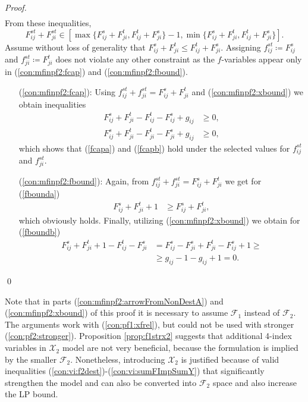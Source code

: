 \begin{proof}
\begin{subequations}
\begin{align}
\end{align}
\end{subequations}
From these inequalities,
$$
 F^{st}_{ij} +  F^{st}_{ji}\in\left[\max\{F^s_{ij}+F^t_{ji},F^t_{ij}+F^s_{ji}\}-1,\min\{F^s_{ij}+F^t_{ji},F^t_{ij}+F^s_{ji}\}\right].
$$
Assume without loss of generality that $F^s_{ij} + F^t_{ji}\leq F^t_{ij} + F^s_{ji}$. Assigning $ f^{st}_{ij}\coloneqq F^s_{ij}$ and $ f^{st}_{ji}\coloneqq F^t_{ji}$ does not violate any other constraint as the $ f$-variables appear only in (\ref{con:mfinpf2:fcap}) and (\ref{con:mfinpf2:fbound}).
\begin{itemize}[leftmargin=1cm]
\item[(\ref{con:mfinpf2:fcap}):]  Using $ f^{st}_{ij} +  f^{st}_{ji} = F^s_{ij} + F^{t}_{ji}$ and (\ref{con:mfinpf2:xbound}) we obtain inequalities
	\begin{align*}
	F^s_{ij} + F^{t}_{ji}-F^t_{ij}-F^s_{ij}+g_{ij}&\geq 0,\\
	F^s_{ij} + F^{t}_{ji}-F^t_{ji}-F^s_{ji}+g_{ij}&\geq 0,
	\end{align*}
	which shows that (\ref{fcapa}) and (\ref{fcapb}) hold under the selected values for $ f^{st}_{ij}$ and $ f^{st}_{ji}$.
\item[(\ref{con:mfinpf2:fbound}):] Again, from $ f^{st}_{ij} +  f^{st}_{ji} = F^s_{ij} + F^{t}_{ji}$  we get for (\ref{fbounda})
	\begin{align*}
	F^s_{ij} + F^{t}_{ji} + 1 &\geq F^s_{ij}+F^t_{ji},
	\end{align*}
	which obviously holds. Finally, utilizing (\ref{con:mfinpf2:xbound}) we obtain for (\ref{fboundb})
	\begin{align*}
	F^s_{ij} + F^{t}_{ji} + 1 -F^t_{ij}-F^s_{ji} &= F^s_{ij}-F^s_{ji}+F^t_{ji}-F^s_{ij}+1 \geq \\
	&\geq g_{ij}-1-g_{ij}+1=0.
	\end{align*}
\end{itemize}\qed
\end{proof} 
Note that in parts (\ref{con:mfinpf2:arrowFromNonDestA}) and (\ref{con:mfinpf2:xbound}) of this proof it is necessary to assume $\mathcal{F}_1$ instead of $\mathcal{F}_2$.
The arguments work with (\ref{con:pf1:xfrel}), but could not be used with stronger (\ref{con:pf2:stronger}).
Proposition \ref{prop:f1strx2} suggests that additional 4-index variables in $\mathcal{X}_2$ model are not very beneficial, because the formulation is implied by the smaller $\mathcal{F}_2$.
Nonetheless, introducing $\mathcal{X}_2$ is justified because of valid inequalities (\ref{con:vi:f2dest})-(\ref{con:vi:sumFImpSumY}) that significantly strengthen the model and can also be converted into $\mathcal{F}_2$ space and also increase the LP bound.

